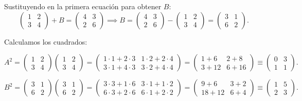 \documentclass[a4paper,12pt]{article}
\begin{document}
\begin{ejercicio}[title=Ejercicio 1]
Sustituyendo en la primera ecuación para obtener \(B\):
\[
\begin{pmatrix}1 & 2\\[2pt]3 & 4\end{pmatrix} + B =
\begin{pmatrix}4 & 3\\[2pt]2 & 6\end{pmatrix}
\implies
B =
\begin{pmatrix}4 & 3\\[2pt]2 & 6\end{pmatrix}
-
\begin{pmatrix}1 & 2\\[2pt]3 & 4\end{pmatrix}
=
\begin{pmatrix}3 & 1\\[2pt]6 & 2\end{pmatrix}.
\]

Calculamos los cuadrados:

\[
A^2 =
\begin{pmatrix}1 & 2\\[2pt]3 & 4\end{pmatrix}
\begin{pmatrix}1 & 2\\[2pt]3 & 4\end{pmatrix}
=
\begin{pmatrix}
1\cdot1+2\cdot3 & 1\cdot2+2\cdot4\\[2pt]
3\cdot1+4\cdot3 & 3\cdot2+4\cdot4
\end{pmatrix}
=
\begin{pmatrix}
1+6 & 2+8\\[2pt]
3+12 & 6+16
\end{pmatrix}
\equiv
\begin{pmatrix}
0 & 3\\[2pt]
1 & 1
\end{pmatrix}.
\]

\[
B^2 =
\begin{pmatrix}3 & 1\\[2pt]6 & 2\end{pmatrix}
\begin{pmatrix}3 & 1\\[2pt]6 & 2\end{pmatrix}
=
\begin{pmatrix}
3\cdot3+1\cdot6 & 3\cdot1+1\cdot2\\[2pt]
6\cdot3+2\cdot6 & 6\cdot1+2\cdot2
\end{pmatrix}
=
\begin{pmatrix}
9+6 & 3+2\\[2pt]
18+12 & 6+4
\end{pmatrix}
\equiv
\begin{pmatrix}
1 & 5\\[2pt]
2 & 3
\end{pmatrix}.
\]


\end{ejercicio}
\end{document}
